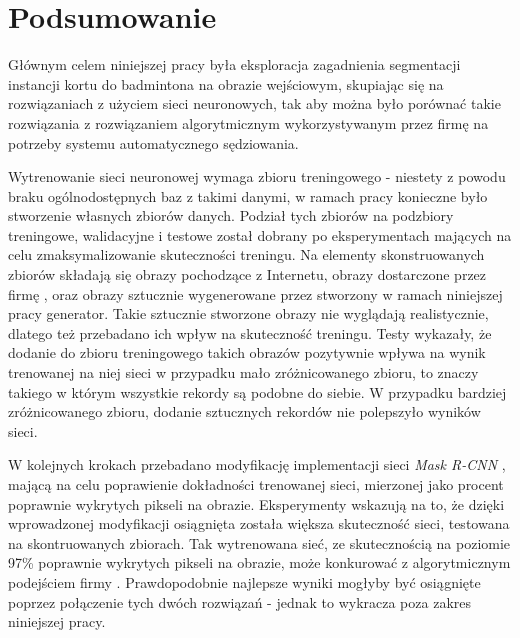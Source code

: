 \chapter{Podsumowanie}

Głównym celem niniejszej pracy była eksploracja zagadnienia segmentacji instancji kortu do badmintona na obrazie wejściowym, skupiając się na rozwiązaniach z użyciem sieci neuronowych, tak aby można było porównać takie rozwiązania z rozwiązaniem algorytmicznym wykorzystywanym przez firmę \blue{} na potrzeby systemu automatycznego sędziowania.

Wytrenowanie sieci neuronowej wymaga zbioru treningowego - niestety z powodu braku ogólnodostępnych baz z takimi danymi, w ramach pracy konieczne było stworzenie własnych zbiorów danych. Podział tych zbiorów na podzbiory treningowe, walidacyjne i testowe został dobrany po eksperymentach mających na celu zmaksymalizowanie skuteczności treningu. Na elementy skonstruowanych zbiorów składają się obrazy pochodzące z Internetu, obrazy dostarczone przez firmę \blue{}, oraz obrazy sztucznie wygenerowane przez stworzony w ramach niniejszej pracy generator. Takie sztucznie stworzone obrazy nie wyglądają realistycznie, dlatego też przebadano ich wpływ na skuteczność treningu. Testy wykazały, że dodanie do zbioru treningowego takich obrazów pozytywnie wpływa na wynik trenowanej na niej sieci w przypadku mało zróżnicowanego zbioru, to znaczy takiego w którym wszystkie rekordy są podobne do siebie. W przypadku bardziej zróżnicowanego zbioru, dodanie sztucznych rekordów nie polepszyło wyników sieci.

W kolejnych krokach przebadano modyfikację implementacji sieci \textit{Mask R-CNN} \cite{matterport-mask-rcnn}, mającą na celu poprawienie dokładności trenowanej sieci, mierzonej jako procent poprawnie wykrytych pikseli na obrazie. Eksperymenty wskazują na to, że dzięki wprowadzonej modyfikacji osiągnięta została większa skuteczność sieci, testowana na skontruowanych zbiorach. Tak wytrenowana sieć, ze skutecznością na poziomie 97\% poprawnie wykrytych pikseli na obrazie, może konkurować z algorytmicznym podejściem firmy \blue{}. Prawdopodobnie najlepsze wyniki mogłyby być osiągnięte poprzez połączenie tych dwóch rozwiązań - jednak to wykracza poza zakres niniejszej pracy.

